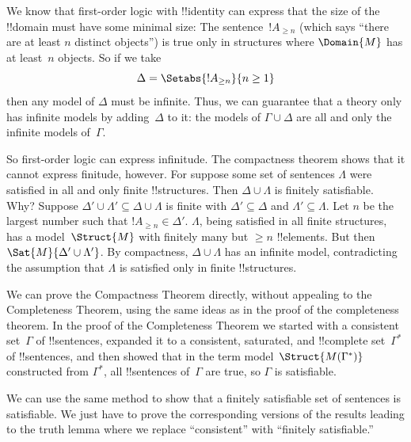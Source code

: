 \begin{ex}
We know that first-order logic with !!{identity} can express that the
size of the !!{domain} must have some minimal size: The
sentence~$!A_{\ge n}$ (which says ``there are at least $n$ distinct
objects'') is true only in structures where $\Domain{M}$ has at
least~$n$ objects. So if we take
  \[
  \Delta = \Setabs{!A_{\ge n}}{n \ge 1}
  \]
then any model of $\Delta$ must be infinite. Thus, we can guarantee
that a theory only has infinite models by adding~$\Delta$ to it: the
models of $\Gamma \cup \Delta$ are all and only the infinite models
of~$\Gamma$.

So first-order logic can express infinitude. The compactness theorem
shows that it cannot express finitude, however. For suppose some set
of sentences $\Lambda$ were satisfied in all and only finite
!!{structure}s. Then $\Delta \cup \Lambda$ is finitely
satisfiable. Why? Suppose $\Delta' \cup \Lambda' \subseteq \Delta \cup
\Lambda$ is finite with $\Delta' \subseteq \Delta$ and $\Lambda'
\subseteq \Lambda$. Let $n$ be the largest number such that $!A_{\ge n}
\in \Delta'$. $\Lambda$, being satisfied in all finite structures, has
a model~$\Struct{M}$ with finitely many but $\ge n$ !!{element}s. But
then $\Sat{M}{\Delta' \cup \Lambda'}$.  By compactness, $\Delta \cup
\Lambda$ has an infinite model, contradicting the assumption that
$\Lambda$ is satisfied only in finite !!{structure}s.
\end{ex}








We can prove the Compactness Theorem directly, without appealing to
the Completeness Theorem, using the same ideas as in the proof of the
completeness theorem.  In the proof of the Completeness Theorem we
started with a consistent set~$\Gamma$ of !!{sentence}s, expanded it
to a consistent, saturated, and !!{complete}
set~$\Gamma^*$ of !!{sentence}s, and then showed that in the
term
  model~$\Struct{M(\Gamma^*)}$
constructed from $\Gamma^*$, all !!{sentence}s of~$\Gamma$ are true,
so $\Gamma$ is satisfiable.

We can use the same method to show that a finitely satisfiable set of
sentences is satisfiable. We just have to prove the corresponding
versions of the results leading to the truth lemma where we replace
``consistent'' with ``finitely satisfiable.''

